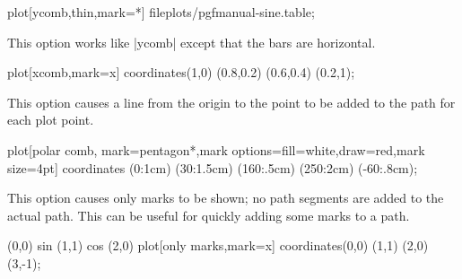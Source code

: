 \begin{itemize}
\begin{codeexample}[]
\tikz{} plot[ycomb,thin,mark=*] file{plots/pgfmanual-sine.table};
\end{codeexample}

\begin{codeexample}[]
\end{codeexample}

  This option works like |ycomb| except that the bars are horizontal. 

\begin{codeexample}[]
\tikz \draw plot[xcomb,mark=x] coordinates{(1,0) (0.8,0.2) (0.6,0.4) (0.2,1)};
\end{codeexample}

  This option causes a line from the origin to the point to be added
  to the path for each plot point.

\begin{codeexample}[]
\tikz \draw plot[polar comb,
     mark=pentagon*,mark options={fill=white,draw=red},mark size=4pt]
   coordinates {(0:1cm) (30:1.5cm) (160:.5cm) (250:2cm) (-60:.8cm)};
\end{codeexample}


  This option causes only marks to be shown; no path segments are
  added to the actual path. This can be useful for quickly adding some
  marks to a path.

\begin{codeexample}[]
\tikz \draw (0,0) sin (1,1) cos (2,0)
  plot[only marks,mark=x] coordinates{(0,0) (1,1) (2,0) (3,-1)};
\end{codeexample}
\end{itemize}


